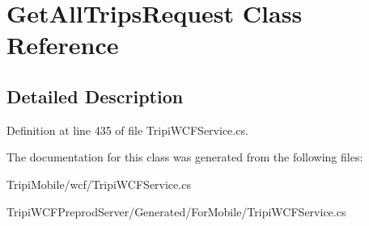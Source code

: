 \hypertarget{class_get_all_trips_request}{
\section{GetAllTripsRequest Class Reference}
\label{class_get_all_trips_request}
}


\subsection{Detailed Description}


Definition at line 435 of file TripiWCFService.cs.

The documentation for this class was generated from the following files:\begin{DoxyCompactItemize}
\item 
TripiMobile/wcf/TripiWCFService.cs\item 
TripiWCFPreprodServer/Generated/ForMobile/TripiWCFService.cs\end{DoxyCompactItemize}
